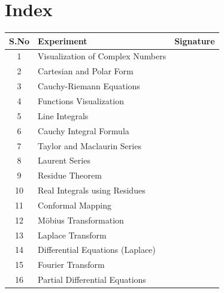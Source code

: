\section*{Index}
\begin{tabular}{|c|p{12cm}|c|}
\hline
S.No & Experiment & Signature \\
\hline
1 & Visualization of Complex Numbers & \\
2 & Cartesian and Polar Form & \\
3 & Cauchy-Riemann Equations & \\
4 & Functions Visualization & \\
5 & Line Integrals & \\
6 & Cauchy Integral Formula & \\
7 & Taylor and Maclaurin Series & \\
8 & Laurent Series & \\
9 & Residue Theorem & \\
10 & Real Integrals using Residues & \\
11 & Conformal Mapping & \\
12 & Möbius Transformation & \\
13 & Laplace Transform & \\
14 & Differential Equations (Laplace) & \\
15 & Fourier Transform & \\
16 & Partial Differential Equations & \\
\hline
\end{tabular}

\newpage